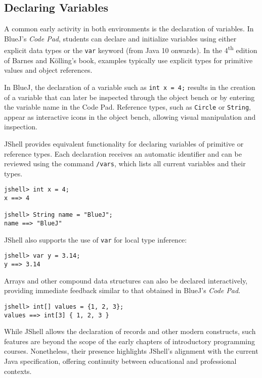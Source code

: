 \documentclass{article}
\begin{document}
\subsection{Declaring Variables}

A common early activity in both environments is the declaration of variables. In BlueJ’s \textit{Code Pad}, students can declare and initialize variables using either explicit data types or the \texttt{var} keyword (from Java 10 onwards). In the 4\textsuperscript{th} edition of Barnes and Kölling’s book, examples typically use explicit types for primitive values and object references.

In BlueJ, the declaration of a variable such as \texttt{int x = 4;} results in the creation of a variable that can later be inspected through the object bench or by entering the variable name in the Code Pad. Reference types, such as \texttt{Circle} or \texttt{String}, appear as interactive icons in the object bench, allowing visual manipulation and inspection.

JShell provides equivalent functionality for declaring variables of primitive or reference types. Each declaration receives an automatic identifier and can be reviewed using the command \texttt{/vars}, which lists all current variables and their types.

\begin{lstlisting}
jshell> int x = 4;
x ==> 4

jshell> String name = "BlueJ";
name ==> "BlueJ"
\end{lstlisting}

JShell also supports the use of \texttt{var} for local type inference:

\begin{lstlisting}
jshell> var y = 3.14;
y ==> 3.14
\end{lstlisting}

Arrays and other compound data structures can also be declared interactively, providing immediate feedback similar to that obtained in BlueJ’s \textit{Code Pad}.

\begin{lstlisting}
jshell> int[] values = {1, 2, 3};
values ==> int[3] { 1, 2, 3 }
\end{lstlisting}

While JShell allows the declaration of records and other modern constructs, such features are beyond the scope of the early chapters of introductory programming courses. Nonetheless, their presence highlights JShell’s alignment with the current Java specification, offering continuity between educational and professional contexts.
\end{document}
